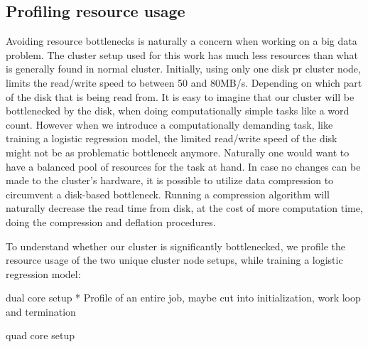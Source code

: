 \subsection{Profiling resource usage}

Avoiding resource bottlenecks is naturally a concern when working on a big data problem. 
The cluster setup used for this work has much less resources than what is generally found in normal cluster. 
Initially, using only one disk pr cluster node, limits the read/write speed to between 50 and 80MB/s. 
Depending on which part of the disk that is being read from. 
It is easy to imagine that our cluster will be bottlenecked by the disk, when doing computationally simple tasks like a word count. 
However when we introduce a computationally demanding task, like training a logistic regression model, the limited read/write speed of the disk might not be as problematic bottleneck anymore. 
Naturally one would want to have a balanced pool of resources for the task at hand. 
In case no changes can be made to the cluster's hardware, it is possible to utilize data compression to circumvent a disk-based bottleneck. 
Running a compression algorithm will naturally decrease the read time from disk, at the cost of more computation time, doing the compression and deflation procedures.

To understand whether our cluster is significantly bottlenecked, we profile the resource usage of the two unique cluster node setups, while training a logistic regression model:

dual core setup
* Profile of an entire job, maybe cut into initialization, work loop and termination

quad core setup
